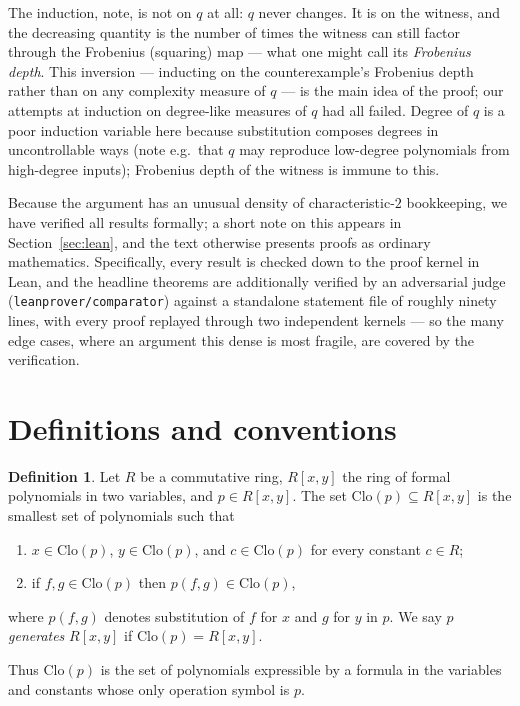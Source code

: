 \documentclass[11pt]{article}
\theoremstyle{definition}
\newtheorem{definition}[theorem]{Definition}
\theoremstyle{remark}
\newcommand{\Clo}{\mathrm{Clo}}
\begin{document}
The induction, note, is not on $q$ at all: $q$ never changes.  It is
on the witness, and the decreasing quantity is the number of times the
witness can still factor through the Frobenius (squaring) map --- what
one might call its \emph{Frobenius depth}.  This inversion ---
inducting on the counterexample's Frobenius depth rather than on
any complexity measure of $q$ --- is the main idea of the proof; our
attempts at induction on degree-like measures of
$q$ had all failed.  Degree of $q$ is a poor induction variable here because
substitution composes degrees in uncontrollable ways (note e.g.\ that
$q$ may reproduce low-degree polynomials from high-degree inputs);
Frobenius depth of the witness is immune to this.

\medskip
Because the argument has an unusual density of characteristic-$2$
bookkeeping, we have verified all results formally; a short note on
this appears in Section~\ref{sec:lean}, and the text otherwise
presents proofs as ordinary mathematics.  Specifically, every result
is checked down to the proof kernel in Lean, and the headline theorems
are additionally verified by an adversarial judge
(\texttt{leanprover/comparator}) against a standalone statement file
of roughly ninety lines, with every proof replayed through two
independent kernels --- so the many edge cases, where an argument this
dense is most fragile, are covered by the verification.

\section{Definitions and conventions}\label{sec:prelim}

\begin{definition}\label{def:clone}
Let $R$ be a commutative ring, $R[x,y]$ the ring of formal
polynomials in two variables, and $p \in R[x,y]$.  The set
$\Clo(p) \subseteq R[x,y]$ is the smallest
set of polynomials such that
\begin{enumerate}
  \item $x \in \Clo(p)$, $y \in \Clo(p)$, and $c \in \Clo(p)$ for
        every constant $c \in R$;
  \item if $f, g \in \Clo(p)$ then $p(f,g) \in \Clo(p)$,
\end{enumerate}
where $p(f,g)$ denotes substitution of $f$ for $x$ and $g$ for $y$ in
$p$.  We say $p$ \emph{generates} $R[x,y]$ if $\Clo(p) = R[x,y]$.
\end{definition}

Thus $\Clo(p)$ is the set of polynomials expressible by a formula in
the variables and constants whose only operation symbol is $p$.
\end{document}
